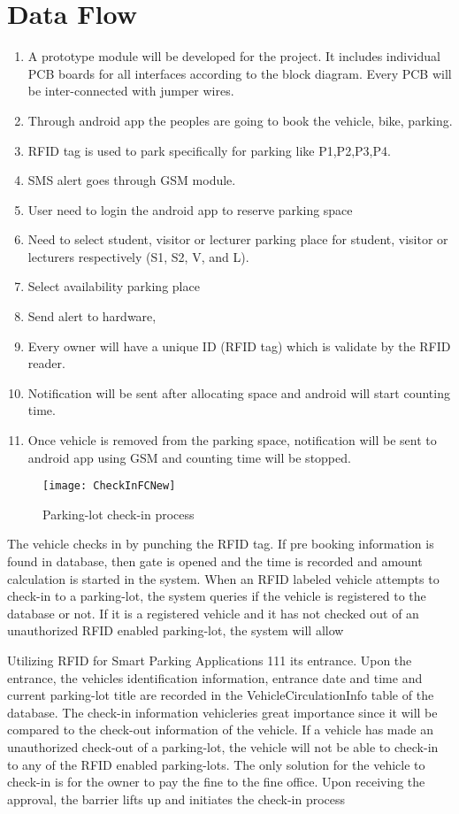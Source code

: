 \documentclass[12pt,a4paper]{report}
\begin{document}
\section{Data Flow}
\begin{enumerate}
	\item A prototype module will be developed for the project. It includes individual PCB boards for all interfaces according to the block diagram. Every PCB will be inter-connected with jumper wires.
	\item Through android app the peoples are going to book the vehicle, bike, parking.
	\item RFID tag is used to  park specifically for parking like P1,P2,P3,P4.
	\item SMS alert goes through GSM module.
	\item User need to login the android app to reserve parking space 
	\item Need to select student, visitor or lecturer parking place for student, visitor or lecturers respectively (S1, S2, V, and L).
	\item Select availability parking place
	\item Send alert to hardware,
	\item Every owner will have a unique ID (RFID tag) which is validate by the RFID reader. 
	\item Notification will be sent after allocating space and android will start
	counting time.
	\item Once vehicle is removed from the parking space, notification will be sent to android app using GSM and counting time will be stopped.
	
\end{enumerate}
\newpage
\begin{figure}[H]
	\begin{center}
		\texttt{[image: CheckInFCNew]}
		\caption{Parking-lot check-in process}
	\end{center}
\end{figure}
The vehicle checks in by punching the RFID tag. If  pre booking information is found in database, then gate is opened and the time is recorded and amount  calculation is started in the system.
When an RFID labeled vehicle attempts to check-in to a parking-lot, the system
queries if the vehicle is registered to the database or not. If it is a registered vehicle and it
has not checked out of an unauthorized RFID enabled parking-lot, the system will allow

Utilizing RFID for Smart Parking Applications 111
its entrance. Upon the entrance, the vehicles identification information, entrance date and
time and current parking-lot title are recorded in the VehicleCirculationInfo table of the
database. The check-in information vehicleries great importance since it will be compared to
the check-out information of the vehicle. If a vehicle has made an unauthorized check-out
of a parking-lot, the vehicle will not be able to check-in to any of the RFID enabled
parking-lots. The only solution for the vehicle to check-in is for the owner to pay the fine
to the fine office. Upon receiving the approval, the barrier lifts up and initiates the check-in
process
\end{document}
